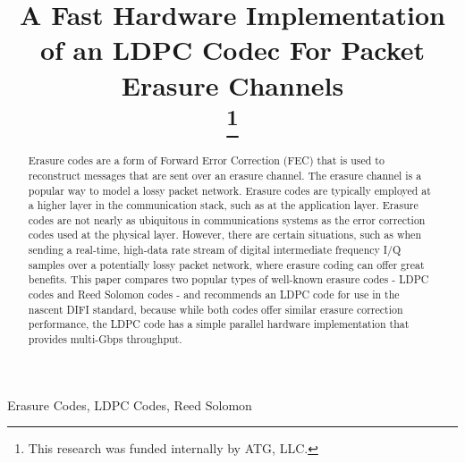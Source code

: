\documentclass[conference]{IEEEtran}
\begin{document}
\title{A Fast Hardware Implementation of an LDPC Codec For Packet Erasure Channels\\
\thanks{This research was funded internally by ATG, LLC.}
}
\author{
 }

\maketitle

\begin{abstract}
Erasure codes are a form of Forward Error Correction (FEC) that is used to reconstruct messages that are sent over an erasure channel.  The erasure channel is a popular way to model a lossy packet network.  Erasure codes are typically employed at a higher layer in the communication stack, such as at the application layer.  Erasure codes are not nearly as ubiquitous in communications systems as the error correction codes used at the physical layer.  However, there are certain situations, such as when sending a real-time, high-data rate stream of digital intermediate frequency I/Q samples over a potentially lossy packet network, where erasure coding can offer great benefits.  This paper compares two popular types of well-known erasure codes - LDPC codes and Reed Solomon codes - and recommends an LDPC code for use in the nascent DIFI \cite{DIFI2021IEEEStd4900-2021} standard, because while both codes offer similar erasure correction performance, the LDPC code has a simple parallel hardware implementation that provides multi-Gbps throughput.
\end{abstract}

\begin{IEEEkeywords}
Erasure Codes, LDPC Codes, Reed Solomon
\end{IEEEkeywords}
\end{document}
